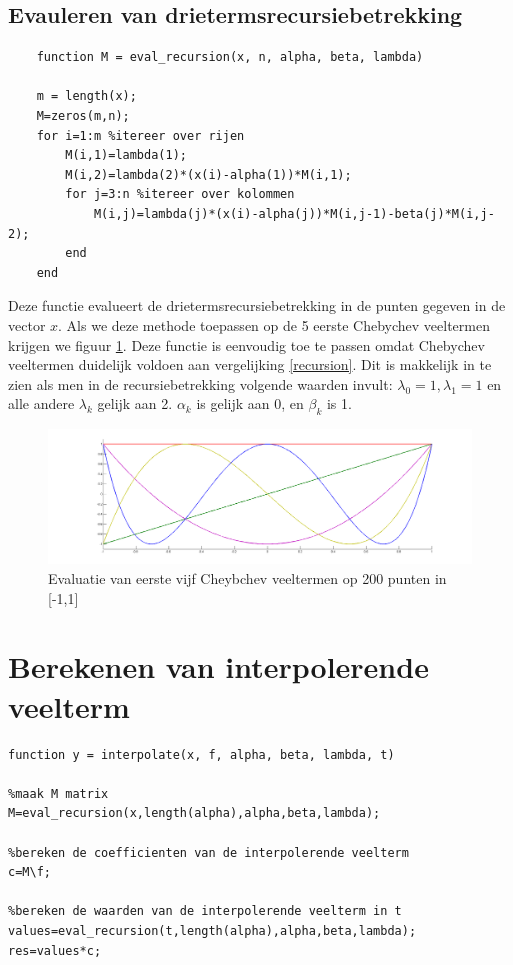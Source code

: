 \documentclass[a4paper, 12pt, titlepage]{report}
\begin{document}
\subsection{Evauleren van drietermsrecursiebetrekking}
\begin{lstlisting}
	function M = eval_recursion(x, n, alpha, beta, lambda)
	
	m = length(x);
	M=zeros(m,n);
	for i=1:m %itereer over rijen
	    M(i,1)=lambda(1);
	    M(i,2)=lambda(2)*(x(i)-alpha(1))*M(i,1);
	    for j=3:n %itereer over kolommen
	        M(i,j)=lambda(j)*(x(i)-alpha(j))*M(i,j-1)-beta(j)*M(i,j-2);
	    end
	end
\end{lstlisting}
Deze functie evalueert de drietermsrecursiebetrekking in de punten gegeven in de vector $x$. Als we deze methode toepassen op de 5 eerste Chebychev veeltermen krijgen we figuur \ref{chebychev}. Deze functie is eenvoudig toe te passen omdat Chebychev veeltermen duidelijk voldoen aan vergelijking \eqref{recursion}. Dit is makkelijk in te zien als men in de recursiebetrekking volgende waarden invult: $\lambda_0=1, \lambda_1=1$ en alle andere $\lambda_k$ gelijk aan 2. $\alpha_k$ is gelijk aan 0, en $\beta_k$ is 1. \\

\begin{figure}[htb]
	\centering
	\includegraphics[width=\textwidth]{chebychev.png}
	\caption{Evaluatie van eerste vijf Cheybchev veeltermen op 200 punten in [-1,1]}
	\label{chebychev}
\end{figure}

\section{Berekenen van interpolerende veelterm}
\begin{lstlisting}
function y = interpolate(x, f, alpha, beta, lambda, t)

%maak M matrix
M=eval_recursion(x,length(alpha),alpha,beta,lambda);

%bereken de coefficienten van de interpolerende veelterm
c=M\f;

%bereken de waarden van de interpolerende veelterm in t
values=eval_recursion(t,length(alpha),alpha,beta,lambda);
res=values*c;
\end{lstlisting}
\end{document}
